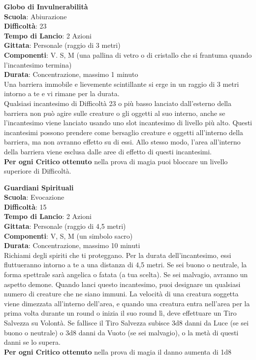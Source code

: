 \begin{multicols}{2}
\medskip\textbf{Globo di Invulnerabilità}\\
\textbf{Scuola}: Abiurazione\\
\textbf{Difficoltà}:  23\\
\textbf{Tempo di Lancio}: 2 Azioni\\
\textbf{Gittata}: Personale (raggio di 3 metri)\\
\textbf{Componenti}: V. S, M (una pallina di vetro o di cristallo che si frantuma quando l'incantesimo termina) \\
\textbf{Durata}: Concentrazione, massimo 1 minuto\\
Una barriera immobile e lievemente scintillante si erge in un raggio di 3 metri intorno a te e vi rimane per la durata.\\
Qualsiasi incantesimo di Difficoltà 23 o più basso lanciato dall'esterno della barriera non può agire sulle creature o gli oggetti al suo interno, anche se l'incantesimo viene lanciato usando uno slot incantesimo di livello più alto. Questi incantesimi possono prendere come bersaglio creature e oggetti all'interno della barriera, ma non avranno effetto su di essi. Allo stesso modo, l’area all'interno della barriera viene esclusa dalle aree di effetto di questi incantesimi.\\
\textbf{Per ogni Critico ottenuto} nella prova di magia puoi bloccare un livello superiore di Difficoltà.

\medskip\textbf{Guardiani Spirituali}\\
\textbf{Scuola}: Evocazione\\
\textbf{Difficoltà}:  15\\
\textbf{Tempo di Lancio}: 2 Azioni\\
\textbf{Gittata}: Personale (raggio di 4,5 metri)\\
\textbf{Componenti}: V, S, M (un simbolo sacro)\\
\textbf{Durata}: Concentrazione, massimo 10 minuti\\
Richiami degli spiriti che ti proteggano. Per la durata dell'incantesimo, essi fluttueranno intorno a te a una distanza di 4,5 metri. Se sei buono o neutrale, la forma spettrale sarà angelica o fatata (a tua scelta). Se sei malvagio, avranno un aspetto demone. Quando lanci questo incantesimo, puoi designare un qualsiasi numero di creature che ne siano immuni. La velocità di una creatura soggetta viene dimezzata all'interno dell'area, e quando una creatura entra nell'area per la prima volta durante un round o inizia il suo round lì, deve effettuare un Tiro Salvezza su Volontà. Se fallisce il Tiro Salvezza subisce 3d8 danni da Luce (se sei buono o neutrale) o 3d8 danni da Vuoto (se sei malvagio), o la metà di questi danni se lo supera.\\
\textbf{Per ogni Critico ottenuto} nella prova di magia  il danno aumenta di 1d8 


\end{multicols}
